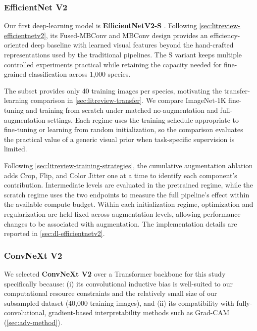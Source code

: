 \subsubsection{EfficientNet V2}
\label{sec:method-efficientnetv2}
Our first deep-learning model is \textbf{EfficientNetV2-S} \cite{tan2021efficientnetv2}. Following \cref{sec:litreview-efficientnetv2}, its Fused-MBConv and MBConv design provides an efficiency-oriented deep baseline with learned visual features beyond the hand-crafted representations used by the traditional pipelines. The S variant keeps multiple controlled experiments practical while retaining the capacity needed for fine-grained classification across 1,000 species.

The subset provides only 40 training images per species, motivating the transfer-learning comparison in \cref{sec:litreview-transfer}. We compare ImageNet-1K fine-tuning and training from scratch under matched no-augmentation and full-augmentation settings. Each regime uses the training schedule appropriate to fine-tuning or learning from random initialization, so the comparison evaluates the practical value of a generic visual prior when task-specific supervision is limited.

Following \cref{sec:litreview-training-strategies}, the cumulative augmentation ablation adds Crop, Flip, and Color Jitter one at a time to identify each component's contribution. Intermediate levels are evaluated in the pretrained regime, while the scratch regime uses the two endpoints to measure the full pipeline's effect within the available compute budget. Within each initialization regime, optimization and regularization are held fixed across augmentation levels, allowing performance changes to be associated with augmentation. The implementation details are reported in \cref{sec:dl-efficientnetv2}.

\subsubsection{ConvNeXt V2}
\label{sec:method-convnextv2}
We selected \textbf{ConvNeXt V2} \cite{woo2023convnextv2} over a Transformer backbone for this study specifically because: (i) its convolutional inductive bias is well-suited to our computational resource constraints and the relatively small size of our subsampled dataset (40,000 training images), and (ii) its compatibility with fully-convolutional, gradient-based interpretability methods such as Grad-CAM (\cref{sec:adv-method}).

